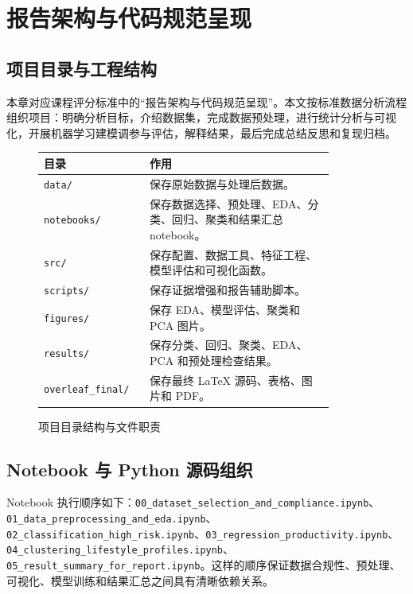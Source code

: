 \chapter{报告架构与代码规范呈现}

\section{项目目录与工程结构}

本章对应课程评分标准中的“报告架构与代码规范呈现”。本文按标准数据分析流程组织项目：明确分析目标，介绍数据集，完成数据预处理，进行统计分析与可视化，开展机器学习建模调参与评估，解释结果，最后完成总结反思和复现归档。

\begin{figure}[H]
\centering
\begin{tabular}{p{0.28\linewidth}p{0.58\linewidth}}
\toprule
目录 & 作用 \\
\midrule
\texttt{data/} & 保存原始数据与处理后数据。\\
\texttt{notebooks/} & 保存数据选择、预处理、EDA、分类、回归、聚类和结果汇总 notebook。\\
\texttt{src/} & 保存配置、数据工具、特征工程、模型评估和可视化函数。\\
\texttt{scripts/} & 保存证据增强和报告辅助脚本。\\
\texttt{figures/} & 保存 EDA、模型评估、聚类和 PCA 图片。\\
\texttt{results/} & 保存分类、回归、聚类、EDA、PCA 和预处理检查结果。\\
\texttt{overleaf\_final/} & 保存最终 LaTeX 源码、表格、图片和 PDF。\\
\bottomrule
\end{tabular}
\caption{项目目录结构与文件职责}
\label{fig:project-structure-rubric}
\end{figure}

\section{Notebook 与 Python 源码组织}

Notebook 执行顺序如下：\texttt{00\_dataset\_selection\_and\_compliance.ipynb}、\texttt{01\_data\_preprocessing\_and\_eda.ipynb}、\texttt{02\_classification\_high\_risk.ipynb}、\texttt{03\_regression\_productivity.ipynb}、\texttt{04\_clustering\_lifestyle\_profiles.ipynb}、\texttt{05\_result\_summary\_for\_report.ipynb}。这样的顺序保证数据合规性、预处理、可视化、模型训练和结果汇总之间具有清晰依赖关系。

